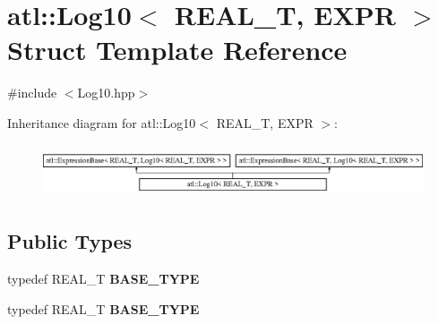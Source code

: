 \hypertarget{structatl_1_1_log10}{\section{atl\+:\+:Log10$<$ R\+E\+A\+L\+\_\+\+T, E\+X\+P\+R $>$ Struct Template Reference}
\label{structatl_1_1_log10}
}


{\ttfamily \#include $<$Log10.\+hpp$>$}

Inheritance diagram for atl\+:\+:Log10$<$ R\+E\+A\+L\+\_\+\+T, E\+X\+P\+R $>$\+:\begin{figure}[H]
\begin{center}
\leavevmode
\includegraphics[height=1.577465cm]{structatl_1_1_log10}
\end{center}
\end{figure}
\subsection*{Public Types}
\begin{DoxyCompactItemize}
\item 
\hypertarget{structatl_1_1_log10_ac314523300a5d801ea0605e6df1cbdc4}{typedef R\+E\+A\+L\+\_\+\+T {\bfseries B\+A\+S\+E\+\_\+\+T\+Y\+P\+E}}\label{structatl_1_1_log10_ac314523300a5d801ea0605e6df1cbdc4}

\item 
\hypertarget{structatl_1_1_log10_ac314523300a5d801ea0605e6df1cbdc4}{typedef R\+E\+A\+L\+\_\+\+T {\bfseries B\+A\+S\+E\+\_\+\+T\+Y\+P\+E}}\label{structatl_1_1_log10_ac314523300a5d801ea0605e6df1cbdc4}

\end{DoxyCompactItemize}
